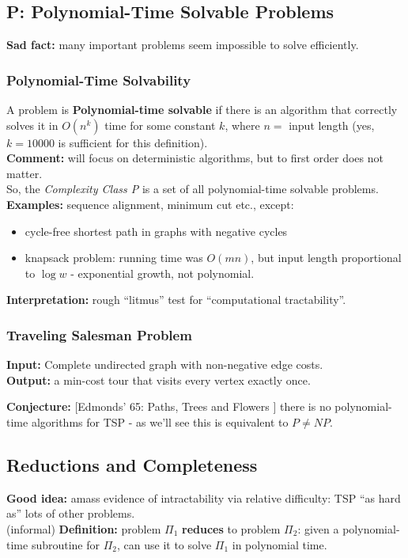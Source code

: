 \documentclass{scrartcl}
\begin{document}
\subsection{P: Polynomial-Time Solvable Problems}
\label{sec:16-1}
{\bf Sad fact: } many important problems seem impossible to solve efficiently.
\subsubsection{Polynomial-Time Solvability}
\label{sec:16-1-1}
A problem is {\bf Polynomial-time solvable } if there is an algorithm that
correctly solves it in $O(n^k)$ time for some constant $k$, where $n=$ input
length (yes, $k=10000$ is sufficient for this definition).\\ 
{\bf Comment: } will focus on deterministic algorithms, but to first order does
not matter.\\
So, the {\em Complexity Class P} is a set of all polynomial-time solvable
problems.\\
{\bf Examples: } sequence alignment, minimum cut etc., except:
\begin{itemize}
\item cycle-free shortest path in graphs with negative cycles
\item knapsack problem: running time was $O(mn)$, but input length proportional
  to $\log w$ - exponential growth, not polynomial.
\end{itemize}
{\bf Interpretation: } rough ``litmus'' test for ``computational tractability''. 

\subsubsection{Traveling Salesman Problem}
\label{sec:16-1-2}
{\bf Input: } Complete undirected graph with non-negative edge costs.\\
{\bf Output: } a min-cost tour that visits every vertex exactly once.

{\bf Conjecture: } [Edmonds' 65: Paths, Trees and Flowers ] there is no
polynomial-time algorithms for TSP - as we'll see this is equivalent to $P \neq NP$. 
\subsection{Reductions and Completeness}
\label{sec:16-2}
{\bf Good idea: } amass evidence of intractability via relative difficulty: TSP
``as hard as'' lots of other problems.\\
(informal) {\bf Definition: } problem $\Pi_1$ {\bf reduces } to problem $\Pi_2$:
given a polynomial-time subroutine for $\Pi_2$, can use it to solve $\Pi_1$ in
polynomial time.\\ 
\end{document}
